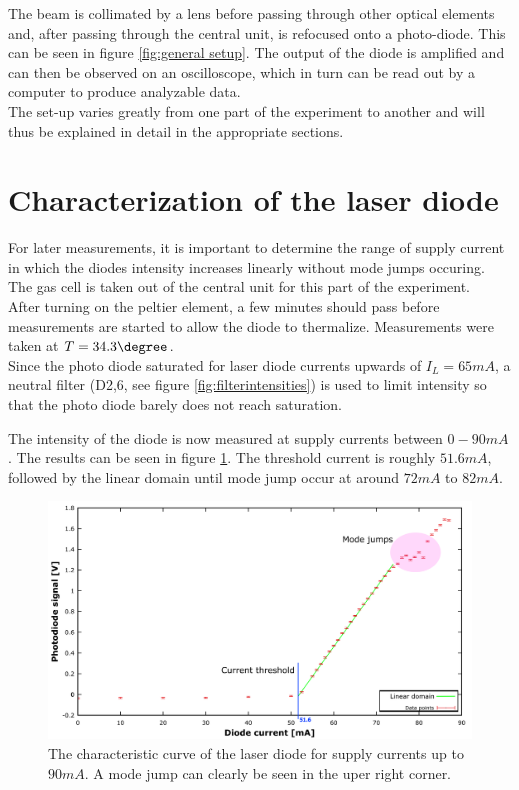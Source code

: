 The beam is collimated by a lens before passing through other optical elements and, after passing through the central unit, is refocused onto a photo-diode. This can be seen in figure \ref{fig:general setup}. The output of the diode is amplified and can then be observed on an oscilloscope, which in turn can be read out by a computer to produce analyzable data.\\ 

The set-up varies greatly from one part of the experiment to another and will thus be explained in detail in the appropriate sections.


\section{Characterization of the laser diode}
For later measurements, it is important to determine the range of supply current in which the diodes intensity increases linearly without mode jumps occuring. The gas cell is taken out of the central unit for this part of the experiment. \\

After turning on the peltier element, a few minutes should pass before measurements are started to allow the diode to thermalize. Measurements were taken at $T=\unit{34.3}{\degree}$.\\
Since the photo diode saturated for laser diode currents upwards of $I_L=\unit{65}{mA}$, a neutral filter (D2,6, see figure \ref{fig:filterintensities}) is used to limit intensity so that the photo diode barely does not reach saturation.

The intensity of the diode is now measured at supply currents between $\unit{0-90}{mA}$. The results can be seen in figure \ref{fig:characterization}. The threshold current is roughly $\unit{51.6}{mA}$, followed by the linear domain until mode jump occur at around $\unit{72}{mA}$ to $\unit{82}{mA}$. 
\begin{figure}[htb]
\centering
\includegraphics[width=1.0\linewidth]{graphics/characterization}
\caption[Characteristic curve of the laser diode]{The characteristic curve of the laser diode for supply currents up to $\unit{90}{mA}$. A mode jump can clearly be seen in the uper right corner.}
\label{fig:characterization}
\end{figure}





